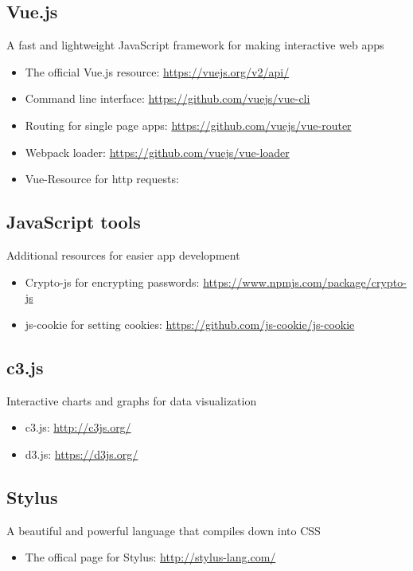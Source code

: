 \documentclass[draftclsnofoot,onecolumn,letterpaper,10pt]{IEEEtran}
\begin{document}
	\subsection{Vue.js}
	A fast and lightweight JavaScript framework for making interactive web apps
	\begin{itemize}
		\item The official Vue.js resource: \hyperlink{https://vuejs.org/v2/api/}{https://vuejs.org/v2/api/}
		\item Command line interface: \hyperlink{https://github.com/vuejs/vue-cli}{https://github.com/vuejs/vue-cli}
		\item Routing for single page apps: \hyperlink{https://github.com/vuejs/vue-router}{https://github.com/vuejs/vue-router}
		\item Webpack loader: \hyperlink{https://github.com/vuejs/vue-loader}{https://github.com/vuejs/vue-loader}
		\item Vue-Resource for http requests: \hyperlink{}{}
	\end{itemize}
	\subsection{JavaScript tools}
	Additional resources for easier app development
	\begin{itemize}
		\item Crypto-js for encrypting passwords: \hyperlink{https://www.npmjs.com/package/crypto-js}{https://www.npmjs.com/package/crypto-js}
		\item js-cookie for setting cookies: \hyperlink{https://github.com/js-cookie/js-cookie}{https://github.com/js-cookie/js-cookie}
	\end{itemize}
	\subsection{c3.js}
	Interactive charts and graphs for data visualization
	\begin{itemize}
		\item c3.js: \hyperlink{http://c3js.org/}{http://c3js.org/}
		\item d3.js: \hyperlink{https://d3js.org/}{https://d3js.org/}
	\end{itemize}
	\subsection{Stylus}
	A beautiful and powerful language that compiles down into CSS
	\begin{itemize}
		\item The offical page for Stylus: \hyperlink{http://stylus-lang.com/}{http://stylus-lang.com/}
	\end{itemize}
\end{document}
